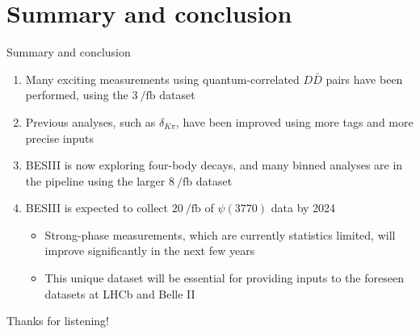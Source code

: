 \documentclass{beamer}
\begin{document}
\section{Summary and conclusion}
\begin{frame}{Summary and conclusion}
  \begin{enumerate}
    \setlength{\itemsep}{1.0em}
    \item{Many exciting measurements using quantum-correlated $D\bar{D}$ pairs have been performed, using the $\SI{3}{\per\femto\barn}$ dataset}
    \item{Previous analyses, such as $\delta_{K\pi}$, have been improved using more tags and more precise inputs}
    \item{BESIII is now exploring four-body decays, and many binned analyses are in the pipeline using the larger $\SI{8}{\per\femto\barn}$ dataset}
    \item{BESIII is expected to collect $\SI{20}{\per\femto\barn}$ of $\psi(3770)$ data by 2024}
    \begin{itemize}
      \item{Strong-phase measurements, which are currently statistics limited, will improve significantly in the next few years}
      \item{This unique dataset will be essential for providing inputs to the foreseen datasets at LHCb and Belle II}
    \end{itemize}
  \end{enumerate}
  \begin{center}
    \huge Thanks for listening!
  \end{center}
\end{frame}
\end{document}
